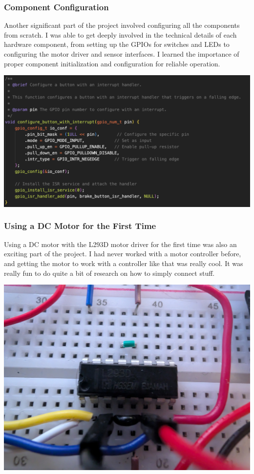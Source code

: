 \subsubsection{Component Configuration}
Another significant part of the project involved configuring all the components from scratch. I was able to get deeply involved in the technical details of each hardware component, from setting up the GPIOs for switches and LEDs to configuring the motor driver and sensor interfaces. I learned the importance of proper component initialization and configuration for reliable operation.

\includegraphics[scale=0.25]{img/configure.png}

\subsubsection{Using a DC Motor for the First Time}
Using a DC motor with the L293D motor driver for the first time was also an exciting part of the project. I had never worked with a motor controller before, and getting the motor to work with a controller like that was really cool. It was really fun to do quite a bit of research on how to simply connect stuff.

\includegraphics[scale=0.10]{img/L293D.png}

